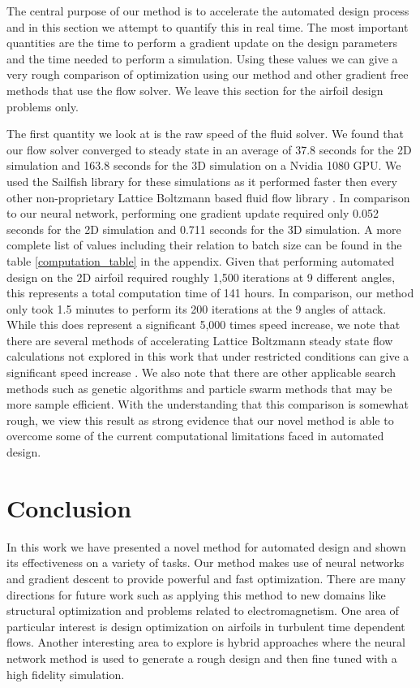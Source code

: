 \documentclass{article} %
\begin{document}
The central purpose of our method is to accelerate the automated design process and in this section we attempt to quantify this in real time. The most important quantities are the time to perform a gradient update on the design parameters and the time needed to perform a simulation. Using these values we can give a very rough comparison of optimization using our method and other gradient free methods that use the flow solver. We leave this section for the airfoil design problems only.

The first quantity we look at is the raw speed of the fluid solver. We found that our flow solver converged to steady state in an average of 37.8 seconds for the 2D simulation and 163.8 seconds for the 3D simulation on a Nvidia 1080 GPU. We used the Sailfish library for these simulations as it performed faster then every other non-proprietary Lattice Boltzmann based fluid flow library \citep{januszewski2014sailfish}. In comparison to our neural network, performing one gradient update required only 0.052 seconds for the 2D simulation and 0.711 seconds for the 3D simulation. A more complete list of values including their relation to batch size can be found in the table \ref{computation_table} in the appendix. Given that performing automated design on the 2D airfoil required roughly 1,500 iterations at 9 different angles, this represents a total computation time of 141 hours. In comparison, our method only took 1.5 minutes to perform its 200 iterations at the 9 angles of attack. While this does represent a significant 5,000 times speed increase, we note that there are several methods of accelerating Lattice Boltzmann steady state flow calculations not explored in this work that under restricted conditions can give a significant speed increase \citep{guo2013lattice} \citep{bernaschi2002computing}. We also note that there are other applicable search methods such as genetic algorithms and particle swarm methods that may be more sample efficient. With the understanding that this comparison is somewhat rough, we view this result as strong evidence that our novel method is able to overcome some of the current computational limitations faced in automated design.

\section{Conclusion}

In this work we have presented a novel method for automated design and shown its effectiveness on a variety of tasks. Our method makes use of neural networks and gradient descent to provide powerful and fast optimization. There are many directions for future work such as applying this method to new domains like structural optimization and problems related to electromagnetism. One area of particular interest is design optimization on airfoils in turbulent time dependent flows. Another interesting area to explore is hybrid approaches where the neural network method is used to generate a rough design and then fine tuned with a high fidelity simulation.
\end{document}
